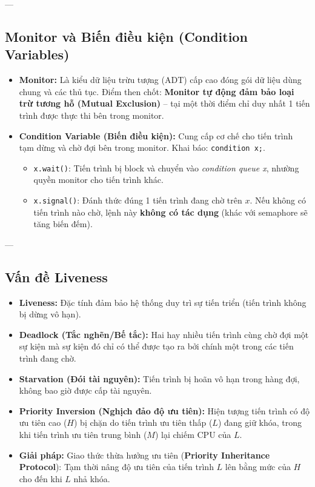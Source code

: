 \documentclass[11pt,a4paper]{article}
\begin{document}
---

\subsection{Monitor và Biến điều kiện (Condition Variables)}
\begin{itemize}
    \item \textbf{Monitor:} Là kiểu dữ liệu trừu tượng (ADT) cấp cao đóng gói dữ liệu dùng chung và các thủ tục. Điểm then chốt: \textbf{Monitor tự động đảm bảo loại trừ tương hỗ (Mutual Exclusion)} -- tại một thời điểm chỉ duy nhất 1 tiến trình được thực thi bên trong monitor.
    \item \textbf{Condition Variable (Biến điều kiện):} Cung cấp cơ chế cho tiến trình tạm dừng và chờ đợi bên trong monitor. Khai báo: \texttt{condition x;}.
    \begin{itemize}[noitemsep]
        \item \texttt{x.wait()}: Tiến trình bị block và chuyển vào \textit{condition queue x}, nhường quyền monitor cho tiến trình khác.
        \item \texttt{x.signal()}: Đánh thức đúng 1 tiến trình đang chờ trên $x$. Nếu không có tiến trình nào chờ, lệnh này \textbf{không có tác dụng} (khác với semaphore sẽ tăng biến đếm).
    \end{itemize}
\end{itemize}

---

\subsection{Vấn đề Liveness}
\begin{itemize}
    \item \textbf{Liveness:} Đặc tính đảm bảo hệ thống duy trì sự tiến triển (tiến trình không bị dừng vô hạn).
    \item \textbf{Deadlock (Tắc nghẽn/Bế tắc):} Hai hay nhiều tiến trình cùng chờ đợi một sự kiện mà sự kiện đó chỉ có thể được tạo ra bởi chính một trong các tiến trình đang chờ.
    \item \textbf{Starvation (Đói tài nguyên):} Tiến trình bị hoãn vô hạn trong hàng đợi, không bao giờ được cấp tài nguyên.
    \item \textbf{Priority Inversion (Nghịch đảo độ ưu tiên):} Hiện tượng tiến trình có độ ưu tiên cao ($H$) bị chặn do tiến trình ưu tiên thấp ($L$) đang giữ khóa, trong khi tiến trình ưu tiên trung bình ($M$) lại chiếm CPU của $L$.
    \item \textbf{Giải pháp:} Giao thức thừa hưởng ưu tiên (\textbf{Priority Inheritance Protocol}): Tạm thời nâng độ ưu tiên của tiến trình $L$ lên bằng mức của $H$ cho đến khi $L$ nhả khóa.
\end{itemize}
\end{document}
